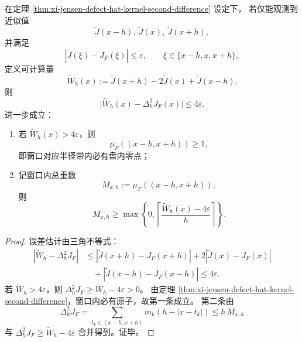 \begin{corollary}[带噪声三点采样下的存在性证书与重数下界]\label{cor:xi-jensen-defect-noisy-threepoint-certificate}
在定理 \ref{thm:xi-jensen-defect-hat-kernel-second-difference} 设定下，
若仅能观测到近似值
\[
\widetilde J(x-h),\ \widetilde J(x),\ \widetilde J(x+h),
\]
并满足
\[
|\widetilde J(\xi)-J_F(\xi)|\le \varepsilon,
\qquad
\xi\in\{x-h,x,x+h\},
\]
定义可计算量
\[
\widetilde W_h(x):=\widetilde J(x+h)-2\widetilde J(x)+\widetilde J(x-h).
\]
则
\[
\bigl|\widetilde W_h(x)-\Delta_h^2J_F(x)\bigr|\le 4\varepsilon.
\]
进一步成立：
\begin{enumerate}
  \item 若 \(\widetilde W_h(x)>4\varepsilon\)，则
  \[
  \mu_F((x-h,x+h))\ge 1,
  \]
  即窗口对应半径带内必有盘内零点；
  \item 记窗口内总重数
  \[
  M_{x,h}:=\mu_F((x-h,x+h)),
  \]
  则
  \[
  M_{x,h}\ge
  \max\!\left\{0,\left\lceil\frac{\widetilde W_h(x)-4\varepsilon}{h}\right\rceil\right\}.
  \]
\end{enumerate}
\end{corollary}
\begin{proof}
误差估计由三角不等式：
\[
\begin{aligned}
|\widetilde W_h-\Delta_h^2J_F|
&\le |\widetilde J(x+h)-J_F(x+h)|
+2|\widetilde J(x)-J_F(x)|\\
&\quad +|\widetilde J(x-h)-J_F(x-h)|
\le 4\varepsilon.
\end{aligned}
\]
若 \(\widetilde W_h>4\varepsilon\)，则 \(\Delta_h^2J_F\ge \widetilde W_h-4\varepsilon>0\)。
由定理 \ref{thm:xi-jensen-defect-hat-kernel-second-difference}，窗口内必有原子，故第一条成立。
第二条由
\[
\Delta_h^2J_F
=\sum_{t_k\in(x-h,x+h)}m_k(h-|x-t_k|)\le h\,M_{x,h}
\]
与 \(\Delta_h^2J_F\ge \widetilde W_h-4\varepsilon\) 合并得到。证毕。
\end{proof}

